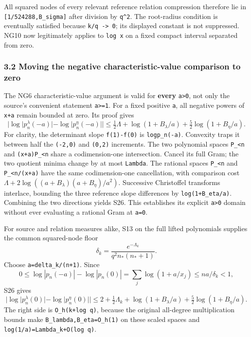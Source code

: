 All squared nodes of every relevant reference relation compression therefore lie in \nolinkurl{[1/524288,B_sigma]} after division by \texttt{q\^{}2}. The root-radius condition is eventually satisfied because \texttt{k/q\ -\textgreater{}\ 0}; its displayed constant is not suppressed. NG10 now legitimately applies to \texttt{log\ x} on a fixed compact interval separated from zero.

\subsubsection{3.2 Moving the negative characteristic-value comparison to zero}\label{moving-the-negative-characteristic-value-comparison-to-zero}

The NG6 characteristic-value argument is valid for \textbf{every} \texttt{a\textgreater{}0}, not only the source's convenient statement \texttt{a\textgreater{}=1}. For a fixed positive \texttt{a}, all negative powers of \texttt{x+a} remain bounded at zero. Its proof gives \[
 |\log|p_n^\lambda(-a)|-\log|p_n^\eta(-a)||
 \le\tfrac12\Lambda+\log(1+B_\lambda/a)
                   +\tfrac52\log(1+B_\eta/a).                    \tag{S26}
\] For clarity, the determinant slope \texttt{f(1)-f(0)} is \texttt{log\textbar{}p\_n(-a)\textbar{}}. Convexity traps it between half the \texttt{(-2,0)} and \texttt{(0,2)} increments. The two polynomial spaces \texttt{P\_\textless{}n} and \texttt{(x+a)P\_\textless{}n} share a codimension-one intersection. Cancel its full Gram; the two quotient minima change by at most \texttt{Lambda}. The rational spaces \texttt{P\_\textless{}n} and \texttt{P\_\textless{}n/(x+a)} have the same codimension-one cancellation, with comparison cost \(\Lambda+2\log((a+B_\lambda)(a+B_\eta)/a^2)\). Successive Christoffel transforms interlace, bounding the three reference slope differences by \texttt{log(1+B\_eta/a)}. Combining the two directions yields S26. This establishes its explicit \texttt{a\textgreater{}0} domain without ever evaluating a rational Gram at \texttt{a=0}.

For source and relation measures alike, S13 on the full lifted polynomials supplies the common squared-node floor \[
 \delta_k=\frac{e^{-\Lambda_k}}{q^2 n_*(n_*+1)}.
\] Choose \texttt{a=delta\_k/(n+1)}. Since \[
 0\le\log|p_n(-a)|-\log|p_n(0)|
 =\sum_j\log(1+a/x_j)\le n a/\delta_k<1,
\] S26 gives \[
 \boxed{|\log|p_n^\lambda(0)|-\log|p_n^\eta(0)||
 \le2+\tfrac12\Lambda_k+\log(1+B_\lambda/a)
                         +\tfrac52\log(1+B_\eta/a).}             \tag{S27}
\] The right side is \texttt{O\_h(k+log\ q)}, because the original all-degree multiplication bounds make \nolinkurl{B_lambda,B_eta=O_h(1)} on these scaled spaces and \nolinkurl{log(1/a)=Lambda_k+O(log q)}.

